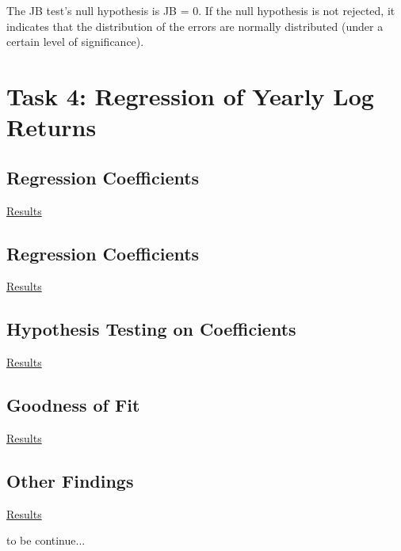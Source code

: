 \documentclass[a4paper]{article}
\begin{document}
	The JB test's null hypothesis is JB = 0. If the null hypothesis is not rejected, it indicates that the
	distribution of the errors are normally distributed (under a certain level of significance).
	
	\section*{Task 4: Regression of Yearly Log Returns}
	\label{sec:num2}
	
	\subsection{Regression Coefficients}
	\underline{Results}
	
	\subsection{Regression Coefficients}
	\underline{Results}
	
	\subsection{Hypothesis Testing on Coefficients}
	\underline{Results}
	
	
	\subsection{Goodness of Fit}
	\underline{Results}
	
	\subsection{Other Findings}
	\underline{Results}
	
	to be continue...
	
\end{document}
